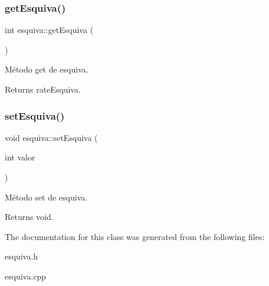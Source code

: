 \subsubsection{\texorpdfstring{get\+Esquiva()}{getEsquiva()}}
{\footnotesize\ttfamily int esquiva\+::get\+Esquiva (\begin{DoxyParamCaption}{ }\end{DoxyParamCaption})}



Método get de esquiva. 

\begin{DoxyReturn}{Returns}
rate\+Esquiva. 
\end{DoxyReturn}
\mbox{\label{classesquiva_a782b543697b0578e0f8efaed5b631209}} 
\subsubsection{\texorpdfstring{set\+Esquiva()}{setEsquiva()}}
{\footnotesize\ttfamily void esquiva\+::set\+Esquiva (\begin{DoxyParamCaption}\item[{int}]{valor }\end{DoxyParamCaption})}



Método set de esquiva. 

\begin{DoxyReturn}{Returns}
void. 
\end{DoxyReturn}


The documentation for this class was generated from the following files\+:\begin{DoxyCompactItemize}
\item 
esquiva.\+h\item 
esquiva.\+cpp\end{DoxyCompactItemize}

